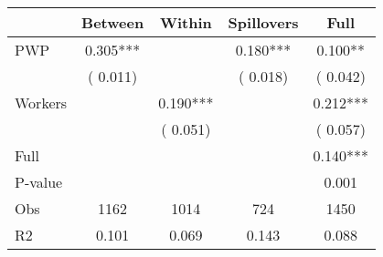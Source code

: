 
\begin{tabular}{l*{4}{c}}\hline&\multicolumn{1}{c}{Between}&\multicolumn{1}{c}{Within}&\multicolumn{1}{c}{Spillovers}&\multicolumn{1}{c}{Full}\\ \hline
 PWP           &              0.305***      &                                               &        0.180*** &         0.100**                            \\ 
                               &        (       0.011)           &                                       &       (       0.018)     &      (       0.042)                                           \\ 
 Workers       &                                               &        0.190***    &                                &             0.212***                            \\ 
                               &                                               & (       0.051)                  &                                        &      (       0.057)                                           \\ 
\hline                                                                                                                                                                                                                                            
 Full                  &                                               &                                               &                                        &             0.140***                                     \\ 
 P-value               &                                               &                                               &                                        &             0.001                                           \\ 
 Obs                   &               1162               &       1014                       &       724                &              1450                                               \\ 
 R2                    &                      0.101              &              0.069                      &              0.143               &                     0.088                                              \\ 
\hline \end{tabular}                                                                                                                                                                                                              